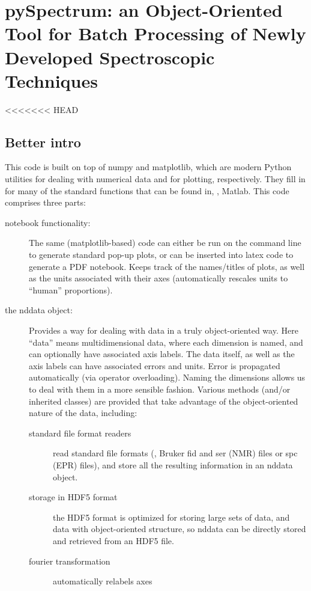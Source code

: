 \chapter{pySpectrum: an Object-Oriented Tool for Batch Processing of Newly Developed Spectroscopic Techniques}
<<<<<<< HEAD
\section{Better intro}
This code is built on top of numpy and matplotlib, which are modern Python utilities for dealing with numerical data and for plotting, respectively.
They fill in for many of the standard functions that can be found in, \eg, Matlab.
This code comprises three parts:
\begin{description}
    \item[notebook functionality:]
        The same (matplotlib-based) code can either be run on the command line
        to generate standard pop-up plots,
        or can be inserted into latex code to generate a PDF notebook.
        Keeps track of the names/titles of plots, as well as the units
        associated with their axes (automatically rescales units to ``human''
        proportions).
    \item[the nddata object:]  
        Provides a way for dealing with data in a truly object-oriented way.
        Here ``data'' means multidimensional data,
        where each dimension is named,
        and can optionally have associated axis labels.
        The data itself, as well as the axis labels can have associated errors
        and units.
        Error is propagated automatically (via operator overloading).
        Naming the dimensions allows us to deal with them in a more sensible
        fashion.
        Various methods (and/or inherited classes) are provided 
        that take advantage of the object-oriented nature of the data, including:
        \begin{description}
            \item[standard file format readers] read standard file formats (\eg,
                Bruker fid and ser (NMR) files or spc (EPR) files),
                and store all the resulting information in an nddata object.
            \item[storage in HDF5 format] the HDF5 format is optimized for storing large sets of data, and data with object-oriented structure, so nddata can be directly stored and retrieved from an HDF5 file. 
            \item[fourier transformation] automatically relabels axes 

\end{description}
\end{description}
